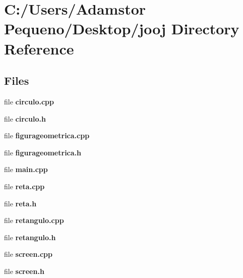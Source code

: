 \section{C\+:/\+Users/\+Adamstor Pequeno/\+Desktop/jooj Directory Reference}
\label{dir_c689d8a089f76e10c65c61ca74471f62}
\subsection*{Files}
\begin{DoxyCompactItemize}
\item 
file \textbf{ circulo.\+cpp}
\item 
file \textbf{ circulo.\+h}
\item 
file \textbf{ figurageometrica.\+cpp}
\item 
file \textbf{ figurageometrica.\+h}
\item 
file \textbf{ main.\+cpp}
\item 
file \textbf{ reta.\+cpp}
\item 
file \textbf{ reta.\+h}
\item 
file \textbf{ retangulo.\+cpp}
\item 
file \textbf{ retangulo.\+h}
\item 
file \textbf{ screen.\+cpp}
\item 
file \textbf{ screen.\+h}
\end{DoxyCompactItemize}
